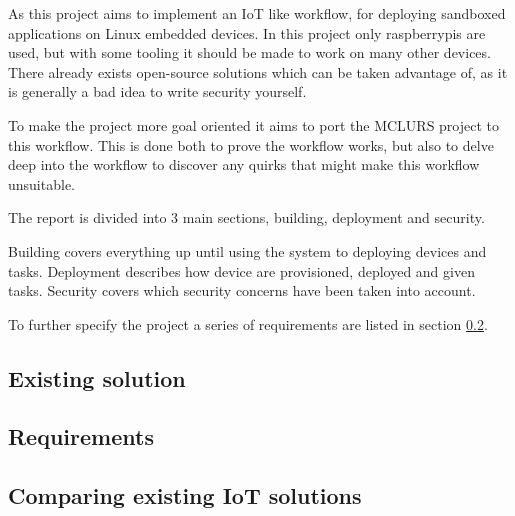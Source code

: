 \documentclass[../../main.tex]{subfiles}
\begin{document}
As this project aims to implement an IoT like workflow, for deploying sandboxed applications
on Linux embedded devices. In this project only raspberrypis are used, but with some
tooling it should be made to work on many other devices.\\

There already exists open-source solutions which can be taken advantage of, as it is generally a bad
idea to write security yourself.

To make the project more goal oriented it aims to port the MCLURS project to this workflow.
This is done both to prove the workflow works, but also to delve deep into the workflow
to discover any quirks that might make this workflow unsuitable.

The report is divided into 3 main sections, building, deployment and security.

Building covers everything up until using the system to deploying devices and tasks.
Deployment describes how device are provisioned, deployed and given tasks.
Security covers which security concerns have been taken into account.

To further specify the project a series of requirements are listed in section \ref{sub:requirements}.


\subsection{Existing solution}%
\label{sub:existing_solution}


\subsection{Requirements}%
\label{sub:requirements}


\subsection{Comparing existing IoT solutions}%
\label{sub:comparing_existing_iot_solutions}

	
\end{document}
